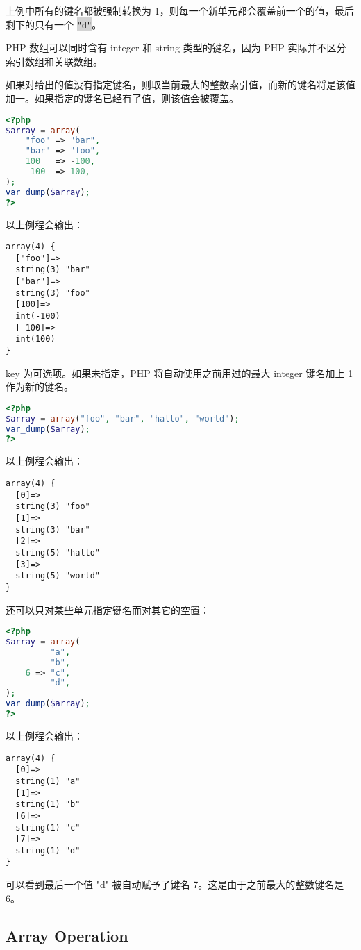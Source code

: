 上例中所有的键名都被强制转换为 1，则每一个新单元都会覆盖前一个的值，最后剩下的只有一个 \colorbox{lightgray}{\texttt{"d"}}。

PHP 数组可以同时含有 integer 和 string 类型的键名，因为 PHP 实际并不区分索引数组和关联数组。

如果对给出的值没有指定键名，则取当前最大的整数索引值，而新的键名将是该值加一。如果指定的键名已经有了值，则该值会被覆盖。

\begin{lstlisting}[language=PHP]
<?php
$array = array(
    "foo" => "bar",
    "bar" => "foo",
    100   => -100,
    -100  => 100,
);
var_dump($array);
?>
\end{lstlisting}

以上例程会输出：


\begin{verbatim}
array(4) {
  ["foo"]=>
  string(3) "bar"
  ["bar"]=>
  string(3) "foo"
  [100]=>
  int(-100)
  [-100]=>
  int(100)
}
\end{verbatim}

key 为可选项。如果未指定，PHP 将自动使用之前用过的最大 integer 键名加上 1 作为新的键名。

\begin{lstlisting}[language=PHP]
<?php
$array = array("foo", "bar", "hallo", "world");
var_dump($array);
?>
\end{lstlisting}

以上例程会输出：


\begin{verbatim}
array(4) {
  [0]=>
  string(3) "foo"
  [1]=>
  string(3) "bar"
  [2]=>
  string(5) "hallo"
  [3]=>
  string(5) "world"
}
\end{verbatim}

还可以只对某些单元指定键名而对其它的空置：

\begin{lstlisting}[language=PHP]
<?php
$array = array(
         "a",
         "b",
    6 => "c",
         "d",
);
var_dump($array);
?>
\end{lstlisting}


以上例程会输出：


\begin{verbatim}
array(4) {
  [0]=>
  string(1) "a"
  [1]=>
  string(1) "b"
  [6]=>
  string(1) "c"
  [7]=>
  string(1) "d"
}
\end{verbatim}

可以看到最后一个值 "d" 被自动赋予了键名 7。这是由于之前最大的整数键名是 6。

\subsection{Array Operation}


